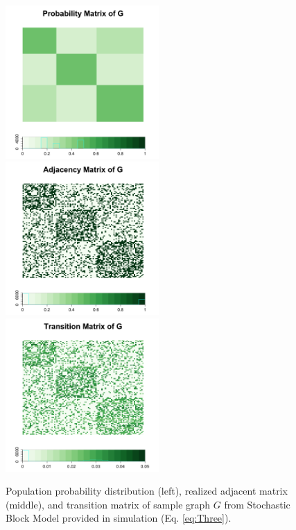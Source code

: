 \documentclass[12pt]{article}
\theoremstyle{definition}
\begin{document}
\begin{figure}[H]
	\centering
	\includegraphics[width=2.3in]{../Figure/pmat.png}
	\includegraphics[width=2.3in]{../Figure/Amat.png}
	\includegraphics[width=2.3in]{../Figure/Tmat.png}
	\caption{Population probability distribution (left), realized adjacent matrix (middle), and transition matrix of sample graph $G$ from Stochastic Block Model provided in simulation (Eq. \ref{eq:Three}).}
	\label{fig:matrics}
\end{figure}	
\end{document}
